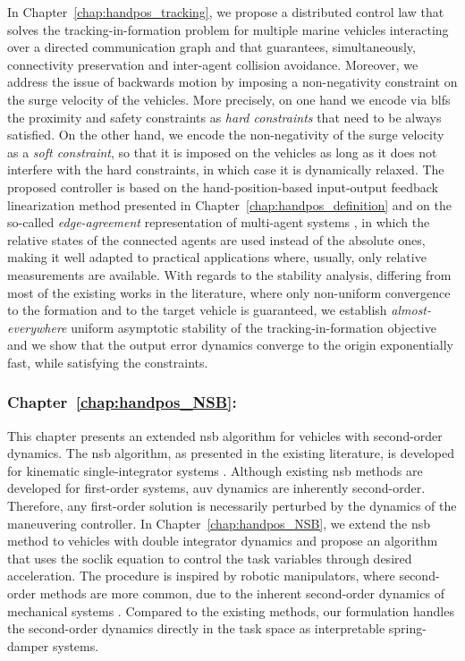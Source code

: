 In Chapter~\ref{chap:handpos_tracking}, we propose a distributed control law that solves the tracking-in-formation problem for multiple marine vehicles interacting over a directed communication graph and that guarantees, simultaneously, connectivity preservation and inter-agent collision avoidance.
Moreover, we address the issue of backwards motion by imposing a non-negativity constraint on the surge velocity of the vehicles.
More precisely, on one hand we encode via \glspl{blf} the proximity and safety constraints as \emph{hard constraints} that need to be always satisfied.
On the other hand, we encode the non-negativity of the surge velocity as a \emph{soft constraint}, so that it is imposed on the vehicles as long as it does not interfere with the hard constraints, in which case it is dynamically relaxed.
The proposed controller is based on the hand-position-based input-output feedback linearization method presented in Chapter~\ref{chap:handpos_definition} and on the so-called \emph{edge-agreement} representation of multi-agent systems \cite{mesbahi_graph_2010}, in which the relative states of the connected agents are used instead of the absolute ones, making it well adapted to practical applications where, usually, only relative measurements are available.
With regards to the stability analysis, differing from most of the existing works in the literature, where only non-uniform convergence to the formation and to the target vehicle is guaranteed, we establish \emph{almost-everywhere} uniform asymptotic stability of the tracking-in-formation objective and we show that the output error dynamics converge to the origin exponentially fast, while satisfying the constraints.

\subsubsection{Chapter~\ref{chap:handpos_NSB}: }

This chapter presents an extended \acrfull{nsb} algorithm for vehicles with second-order dynamics.
The \gls{nsb} algorithm, as presented in the existing literature, is developed for kinematic single-integrator systems \cite{arrichiello_formation_2006,matous_singularity_2023,eek_formation_2021}.
Although existing \gls{nsb} methods are developed for first-order systems, \gls{auv} dynamics are inherently second-order. Therefore, any first-order solution is necessarily perturbed by the dynamics of the maneuvering controller.
In Chapter~\ref{chap:handpos_NSB}, we extend the \gls{nsb} method to vehicles with double integrator dynamics and propose an algorithm that uses the \acrlong{soclik} equation to control the task variables through desired acceleration. The procedure is inspired by robotic manipulators, where second-order methods are more common, due to the inherent second-order dynamics of mechanical systems \cite{siciliano_differential_2009, chiaverini_kinematically_2008}. Compared to the existing methods, our formulation handles the second-order dynamics directly in the task space as interpretable spring-damper systems.

